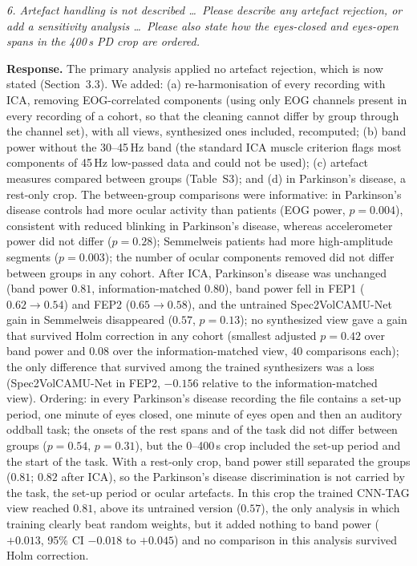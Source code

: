 \documentclass[11pt]{article}
\newcommand{\rc}[1]{\par\medskip\noindent\textit{#1}\par\smallskip}
\newcommand{\resp}{\noindent\textbf{Response.} }
\begin{document}
\rc{6. Artefact handling is not described \ldots\ Please describe any artefact rejection, or add a sensitivity analysis \ldots\ Please also state how the eyes-closed and eyes-open spans in the 400\,s PD crop are ordered.}
\resp The primary analysis applied no artefact rejection, which is now stated (Section~3.3). We added: (a) re-harmonisation of every recording with ICA, removing EOG-correlated components (using only EOG channels present in every recording of a cohort, so that the cleaning cannot differ by group through the channel set), with all views, synthesized ones included, recomputed; (b) band power without the 30--45\,Hz band (the standard ICA muscle criterion flags most components of 45\,Hz low-passed data and could not be used); (c) artefact measures compared between groups (Table~S3); and (d) in Parkinson's disease, a rest-only crop. The between-group comparisons were informative: in Parkinson's disease controls had more ocular activity than patients (EOG power, $p=0.004$), consistent with reduced blinking in Parkinson's disease, whereas accelerometer power did not differ ($p=0.28$); Semmelweis patients had more high-amplitude segments ($p=0.003$); the number of ocular components removed did not differ between groups in any cohort. After ICA, Parkinson's disease was unchanged (band power $0.81$, information-matched $0.80$), band power fell in FEP1 ($0.62\to0.54$) and FEP2 ($0.65\to0.58$), and the untrained Spec2VolCAMU-Net gain in Semmelweis disappeared ($0.57$, $p=0.13$); no synthesized view gave a gain that survived Holm correction in any cohort (smallest adjusted $p=0.42$ over band power and $0.08$ over the information-matched view, 40 comparisons each); the only difference that survived among the trained synthesizers was a loss (Spec2VolCAMU-Net in FEP2, $-0.156$ relative to the information-matched view). Ordering: in every Parkinson's disease recording the file contains a set-up period, one minute of eyes closed, one minute of eyes open and then an auditory oddball task; the onsets of the rest spans and of the task did not differ between groups ($p=0.54$, $p=0.31$), but the 0--400\,s crop included the set-up period and the start of the task. With a rest-only crop, band power still separated the groups ($0.81$; $0.82$ after ICA), so the Parkinson's disease discrimination is not carried by the task, the set-up period or ocular artefacts. In this crop the trained CNN-TAG view reached $0.81$, above its untrained version ($0.57$), the only analysis in which training clearly beat random weights, but it added nothing to band power ($+0.013$, 95\% CI $-0.018$ to $+0.045$) and no comparison in this analysis survived Holm correction.
\end{document}
